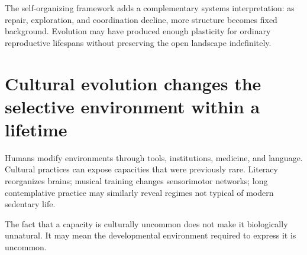 The self-organizing framework adds a complementary systems interpretation: as repair, exploration, and coordination decline, more structure becomes fixed background. Evolution may have produced enough plasticity for ordinary reproductive lifespans without preserving the open landscape indefinitely.

\section{Cultural evolution changes the selective environment within a lifetime}\label{cultural-evolution-changes-the-selective-environment-within-a-lifetime}

Humans modify environments through tools, institutions, medicine, and language. Cultural practices can expose capacities that were previously rare. Literacy reorganizes brains; musical training changes sensorimotor networks; long contemplative practice may similarly reveal regimes not typical of modern sedentary life.

The fact that a capacity is culturally uncommon does not make it biologically unnatural. It may mean the developmental environment required to express it is uncommon.
